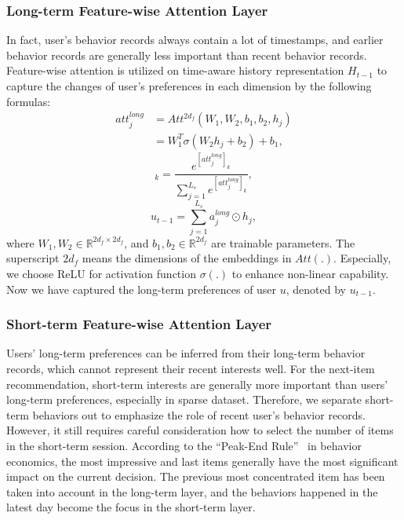 \documentclass[preprint,12pt]{elsarticle}
\begin{document}
\begin{sloppypar}
\subsubsection{Long-term Feature-wise Attention Layer}

In fact, user's behavior records always contain a lot of timestamps, and earlier behavior records are generally less important than recent behavior records. Feature-wise attention is utilized on time-aware history representation $H_{t-1}$ to capture the changes of user's preferences in each dimension by the following formulas:
\begin{equation}
\begin{aligned}
att^{long}_j &= Att^{2d_{f}}(W_1, W_2, b_1, b_2, h_j) \\&= W_1^T\sigma (W_2h_j + b_2) + b_1,
\end{aligned}
\end{equation}
\begin{equation}
[a^{long}_j]_k = \frac{e^{[att^{long}_j]_k}}{\sum_{j=1}^{L_s} e^{[att^{long}_j]_k}},
\end{equation}
\begin{equation}
u_{t-1} = \sum_{j=1}^{L_s} a^{long}_j\odot h_j,
\end{equation}
where $W_1, W_2\in \mathbb{R}^{2d_{f}\times 2d_{f}}$, and $b_1, b_2\in \mathbb{R}^{2d_{f}}$ are trainable parameters. The superscript $2d_{f}$ means the dimensions of the embeddings in $Att(.)$. Especially, we choose ReLU for activation function $\sigma(.)$ to enhance non-linear capability. Now we have captured the long-term preferences of user $u$, denoted by $u_{t-1}$.

\subsubsection{Short-term Feature-wise Attention Layer}

Users' long-term preferences can be inferred from their long-term behavior records, which cannot represent their recent interests well. For the next-item recommendation, short-term interests are generally more important than users' long-term preferences, especially in sparse dataset. Therefore, we separate short-term behaviors out to emphasize the role of recent user's behavior records. However, it still requires careful consideration how to select the number of items in the short-term session. According to the ``Peak-End Rule''~\cite{do2008evaluations} in behavior economics, the most impressive and last items generally have the most significant impact on the current decision. The previous most concentrated item has been taken into account in the long-term layer, and the behaviors happened in the latest day become the focus in the short-term layer.


\end{sloppypar}
\end{document}
